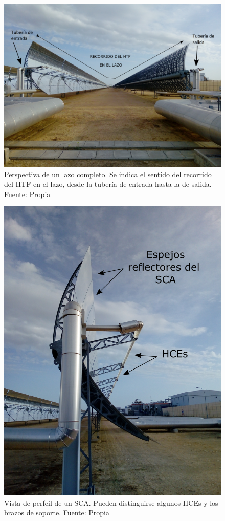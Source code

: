 \begin{figure}
\includegraphics[width=0.9\linewidth]{images/entrada_salida_lazo2_texto.png}
\caption{Perspectiva de un lazo completo. Se indica el sentido del recorrido del HTF en el lazo, desde la tubería de entrada hasta la de salida. Fuente: Propia} 
\label{fig:entrada_salida_lazo}
\end{figure}


\begin{figure}
\includegraphics[width=0.9\linewidth]{images/perfil_sca_2_texto.png}
\caption{Vista de perfeil de un SCA. Pueden distinguirse algunos HCEs y los brazos de soporte. Fuente: Propia} 
\label{fig:perfil_sca}
\end{figure}

